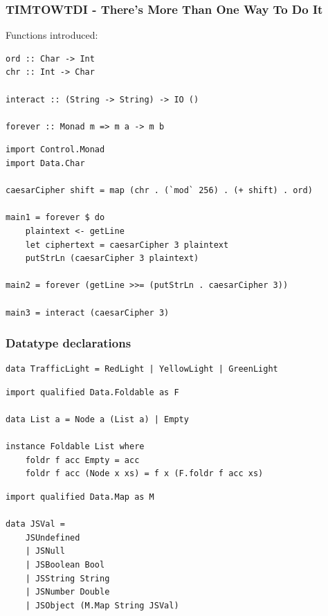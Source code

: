\documentclass{beamer}
\begin{document}
\begin{frame}[fragile]
\frametitle{TIMTOWTDI - There's More Than One Way To Do It}
Functions introduced:
\begin{Verbatim}[frame=single, fontsize=\scriptsize]
ord :: Char -> Int
chr :: Int -> Char

interact :: (String -> String) -> IO ()

forever :: Monad m => m a -> m b
\end{Verbatim}
\begin{Verbatim}[frame=single, fontsize=\scriptsize]
import Control.Monad
import Data.Char

caesarCipher shift = map (chr . (`mod` 256) . (+ shift) . ord)

main1 = forever $ do
    plaintext <- getLine
    let ciphertext = caesarCipher 3 plaintext
    putStrLn (caesarCipher 3 plaintext)

main2 = forever (getLine >>= (putStrLn . caesarCipher 3))

main3 = interact (caesarCipher 3)
\end{Verbatim}
\end{frame}

\begin{frame}[fragile]
\frametitle{Datatype declarations}
\begin{Verbatim}[frame=single, fontsize=\scriptsize]
data TrafficLight = RedLight | YellowLight | GreenLight
\end{Verbatim}
\begin{Verbatim}[frame=single, fontsize=\scriptsize]
import qualified Data.Foldable as F

data List a = Node a (List a) | Empty

instance Foldable List where
    foldr f acc Empty = acc
    foldr f acc (Node x xs) = f x (F.foldr f acc xs)
\end{Verbatim}
\begin{Verbatim}[frame=single, fontsize=\scriptsize]
import qualified Data.Map as M

data JSVal =
    JSUndefined
    | JSNull
    | JSBoolean Bool
    | JSString String
    | JSNumber Double
    | JSObject (M.Map String JSVal)
\end{Verbatim}
\end{frame}
\end{document}

